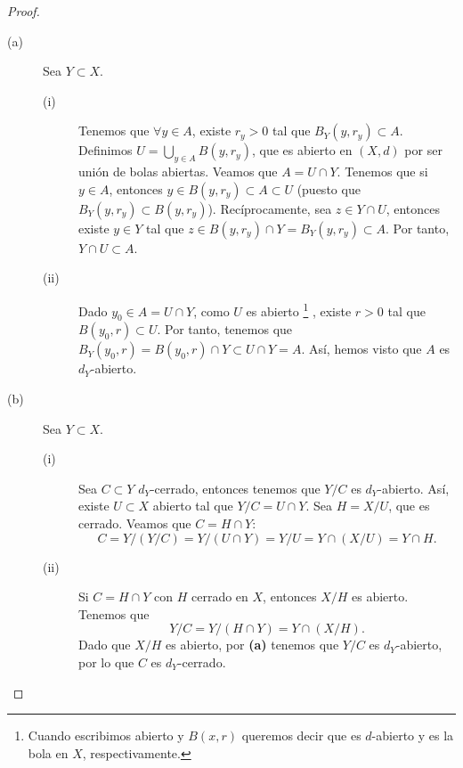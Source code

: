 \begin{proof}
\begin{description}
\item[(a)] Sea $\displaystyle Y \subset X $.
	\begin{description}
	\item[(i)] Tenemos que $\displaystyle \forall y \in A $, existe $\displaystyle r_{y}>0 $ tal que $\displaystyle B_{Y}\left(y,r_{y}\right) \subset A $. Definimos $\displaystyle U = \bigcup_{y \in A}B\left(y,r_{y}\right) $, que es abierto en $\displaystyle \left(X,d\right) $ por ser unión de bolas abiertas.
Veamos que $\displaystyle A = U \cap Y $. Tenemos que si $\displaystyle y \in A $, entonces $\displaystyle y \in B\left(y, r_{y}\right) \subset A \subset U $ (puesto que $\displaystyle B_{Y}\left(y, r_{y}\right) \subset B\left(y, r_{y}\right) $).
Recíprocamente, sea $\displaystyle z \in Y \cap U $, entonces existe $\displaystyle y \in Y $ tal que $\displaystyle z \in B\left(y,r_{y}\right) \cap Y = B_{Y}\left(y,r_{y}\right) \subset A$. Por tanto, $\displaystyle Y \cap U \subset A $.
	\item[(ii)] Dado $\displaystyle y_{0} \in A = U \cap Y $, como $\displaystyle U $ es abierto \footnote{Cuando escribimos abierto y $\displaystyle B\left(x,r\right) $ queremos decir que es $\displaystyle d $-abierto y es la bola en $\displaystyle X $, respectivamente.} , existe $\displaystyle r > 0 $ tal que $\displaystyle B\left(y_{0}, r\right)\subset U $. Por tanto, tenemos que $\displaystyle B_{Y}\left(y_{0}, r\right) = B\left(y_{0}, r\right)\cap Y \subset U \cap Y = A $. Así, hemos visto que $\displaystyle A $ es $\displaystyle d _{Y} $-abierto.
	\end{description}
\item[(b)] Sea $\displaystyle Y \subset X $.
	\begin{description}
	\item[(i)] Sea $\displaystyle C \subset Y $ $\displaystyle d _{Y} $-cerrado, entonces tenemos que $\displaystyle Y/C $ es $\displaystyle d _{Y} $-abierto. Así, existe $\displaystyle U \subset X $ abierto tal que $\displaystyle Y/C = U \cap Y $. Sea $\displaystyle H = X/U $, que es cerrado. Veamos que $\displaystyle C = H \cap Y $:
\[C = Y / \left(Y / C\right) = Y / \left(U \cap Y\right) = Y / U = Y \cap \left(X/U\right) = Y \cap H .\]
\item[(ii)] Si $\displaystyle C = H\cap Y $ con $\displaystyle H $ cerrado en $\displaystyle X $, entonces $\displaystyle X/H $ es abierto. Tenemos que
	\[Y/C = Y / \left(H \cap Y\right) = Y \cap \left(X/H\right) .\]
	Dado que $\displaystyle X/H $ es abierto, por \textbf{(a)} tenemos que $\displaystyle Y/C $ es $\displaystyle d _{Y} $-abierto, por lo que $\displaystyle C $ es $\displaystyle d _{Y} $-cerrado.
	\end{description}
\end{description}
\end{proof}
